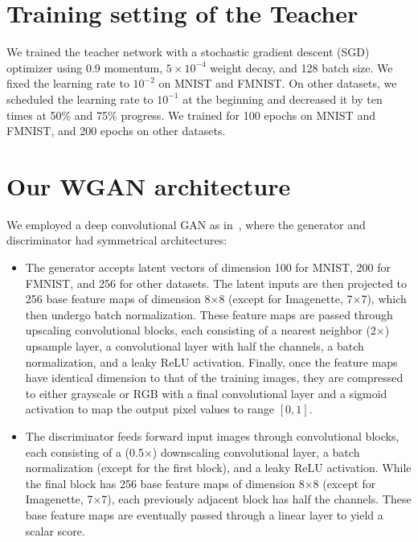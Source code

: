 \section{Training setting of the Teacher} \label{sec:supp-training}
\begin{foldable}
  We trained the teacher network with a stochastic gradient descent (SGD) optimizer using 0.9 momentum, $5\times10^{-4}$ weight decay, and 128 batch size.
  We fixed the learning rate to $10^{-2}$ on MNIST and FMNIST.
  On other datasets, we scheduled the learning rate to $10^{-1}$ at the beginning and decreased it by ten times at 50\% and 75\% progress.
  We trained for 100 epochs on MNIST and FMNIST, and 200 epochs on other datasets.
\end{foldable}

\section{Our WGAN architecture} \label{sec:supp-wgan-arch}
\begin{foldable}
  We employed a deep convolutional GAN as in~\cite{radford2015unsupervised}, where the generator and discriminator had symmetrical architectures:
  \begin{itemize}
    \item {
        The generator accepts latent vectors of dimension 100 for MNIST, 200 for FMNIST, and 256 for other datasets.
        The latent inputs are then projected to 256 base feature maps of dimension 8$\times$8 (except for Imagenette, 7$\times$7), which then undergo batch normalization.
        These feature maps are passed through upscaling convolutional blocks, each consisting of a nearest neighbor (2$\times$) upsample layer, a convolutional layer with half the channels, a batch normalization, and a leaky ReLU activation.
        Finally, once the feature maps have identical dimension to that of the training images, they are compressed to either grayscale or RGB with a final convolutional layer and a sigmoid activation to map the output pixel values to range $[0, 1]$.
      }
    \item {
        The discriminator feeds forward input images through convolutional blocks, each consisting of a (0.5$\times$) downscaling convolutional layer, a batch normalization (except for the first block), and a leaky ReLU activation.
        While the final block has 256 base feature maps of dimension 8$\times$8 (except for Imagenette, 7$\times$7), each previously adjacent block has half the channels.
        These base feature maps are eventually passed through a linear layer to yield a scalar score.
      }
  \end{itemize}
\end{foldable}

